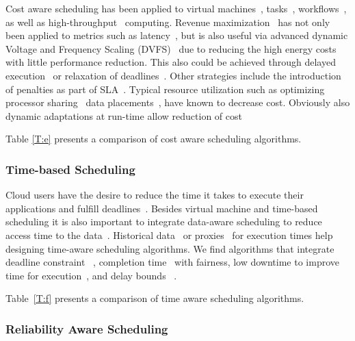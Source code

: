 \documentclass[final,5p,times,twocolumn]{elsarticle}
\begin{document}
Cost aware scheduling has been applied to virtual
machines~\cite{yuan2017ttsa},
tasks~\cite{yuan2017temporal,zuo2015multi},
workflows~\cite{arabnejad2015cost,arabnejad2016budget}, as well as
high-throughput~\cite{yuan2016cawsac} computing.  Revenue
maximization~\cite{yuan2018warm} has not only been applied to metrics
such as latency~\cite{ghahramani2017toward}, but is also useful via
advanced dynamic Voltage and Frequency Scaling
(DVFS)~\cite{las10cloudsched,calheiros2014energy} due to reducing the
high energy costs with little performance reduction. This also could
be achieved through delayed execution~\cite{bi2016trs} or relaxation
of deadlines~\cite{zhang2018dynamic}.  Other strategies include the
introduction of penalties as part of SLA~\cite{wu2012sla}. Typical
resource utilization such as optimizing processor
sharing~\cite{lee2012profit} data placements~\cite{lee2012profit},
have known to decrease cost. Obviously also dynamic
adaptations at run-time allow reduction of cost~\cite{ari2013design}

Table \ref{T:e} presents a comparison of cost aware scheduling
algorithms.

%

\subsubsection{Time-based Scheduling}\label{sec:time}


Cloud users have the desire to reduce the time it takes to execute
their applications and fulfill
deadlines~\cite{arabnejad2017scheduling}.  Besides virtual machine and
time-based scheduling it is also important to integrate data-aware
scheduling to reduce access time to the data~\cite{vandenbosshe2013}.
Historical data~\cite{thomas2015credit} or
proxies~\cite{erdil2013autonomic} for execution times help designing
time-aware scheduling algorithms.  We find algorithms that integrate
deadline constraint ~\cite{li2016energy}, completion
time~\cite{xu2011job} with fairness, low downtime to improve time for
execution~\cite{frincu2014scheduling}, and delay bounds
~\cite{yuan2017time}.

Table~\ref{T:f} presents a comparison of time aware
scheduling algorithms.

%

\subsubsection{Reliability Aware Scheduling}\label{sec:reliability}
\end{document}
